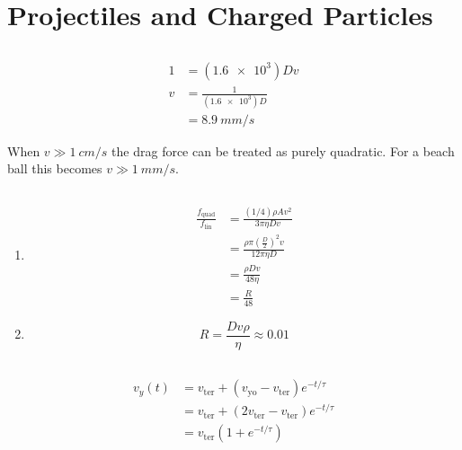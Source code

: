 \documentclass{article}
\begin{document}
\section{Projectiles and Charged Particles}

\subsection{}

\begin{align*}
  1 & = (\num{1.6e3}) D v         \\
  v & = \frac{1}{(\num{1.6e3}) D} \\
    & = \qty{8.9}{mm/s}
\end{align*}

When $v \gg \qty{1}{cm/s}$ the drag force can be treated as purely quadratic. For a beach ball this becomes $v \gg \qty{1}{mm/s}$.

\setcounter{subsection}{2}
\subsection{}

\begin{enumerate}
  \item

        \begin{align*}
          \frac{f_\text{quad}}{f_\text{lin}} & = \frac{(1 / 4) \rho A v^2}{3 \pi \eta D v}                     \\
                                             & = \frac{\rho \pi \left( \frac{D}{2} \right)^2 v}{12 \pi \eta D} \\
                                             & = \frac{\rho D v}{48 \eta}                                      \\
                                             & = \frac{R}{48}
        \end{align*}

  \item \[R = \frac{D v \rho}{\eta} \approx 0.01\]
\end{enumerate}

\setcounter{subsection}{4}
\subsection{}

\begin{align*}
  v_y(t) & = v_\text{ter} + (v_\text{yo} - v_\text{ter}) e^{-t / \tau}    \\
         & = v_\text{ter} + (2 v_\text{ter} - v_\text{ter}) e^{-t / \tau} \\
         & = v_\text{ter} (1 + e^{-t / \tau})
\end{align*}
\end{document}
